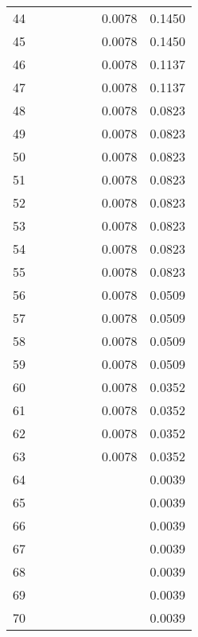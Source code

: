 \documentclass[12pt]{article}
\begin{document}
\begin{center}
\begin{longtable}{|c|c|c|c|c|c|c|c|}
                    44 &  &  &  &  &  & 0.0078 & 0.1450 \\
                    45 &  &  &  &  &  & 0.0078 & 0.1450 \\
                    46 &  &  &  &  &  & 0.0078 & 0.1137 \\
                    47 &  &  &  &  &  & 0.0078 & 0.1137 \\
                    48 &  &  &  &  &  & 0.0078 & 0.0823 \\
                    49 &  &  &  &  &  & 0.0078 & 0.0823 \\
                    50 &  &  &  &  &  & 0.0078 & 0.0823 \\
                    51 &  &  &  &  &  & 0.0078 & 0.0823 \\
                    52 &  &  &  &  &  & 0.0078 & 0.0823 \\
                    53 &  &  &  &  &  & 0.0078 & 0.0823 \\
                    54 &  &  &  &  &  & 0.0078 & 0.0823 \\
                    55 &  &  &  &  &  & 0.0078 & 0.0823 \\
                    56 &  &  &  &  &  & 0.0078 & 0.0509 \\
                    57 &  &  &  &  &  & 0.0078 & 0.0509 \\
                    58 &  &  &  &  &  & 0.0078 & 0.0509 \\
                    59 &  &  &  &  &  & 0.0078 & 0.0509 \\
                    60 &  &  &  &  &  & 0.0078 & 0.0352 \\
                    61 &  &  &  &  &  & 0.0078 & 0.0352 \\
                    62 &  &  &  &  &  & 0.0078 & 0.0352 \\
                    63 &  &  &  &  &  & 0.0078 & 0.0352 \\
                    64 &  &  &  &  &  &  & 0.0039 \\
                    65 &  &  &  &  &  &  & 0.0039 \\
                    66 &  &  &  &  &  &  & 0.0039 \\
                    67 &  &  &  &  &  &  & 0.0039 \\
                    68 &  &  &  &  &  &  & 0.0039 \\
                    69 &  &  &  &  &  &  & 0.0039 \\
                    70 &  &  &  &  &  &  & 0.0039 \\

\end{longtable}
\end{center}
\end{document}

